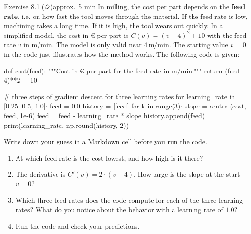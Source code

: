 \documentclass[paper=a4, fontsize=11pt, parskip=half]{scrartcl}
\begin{document}
\clearpage
\begin{aufgabe}{Exercise 8.1 (✩)}{approx.\ 5 min}
In milling, the cost per part depends on the \textbf{feed rate}, i.e. on how fast the tool moves through the material. If the feed rate is low, machining takes a long time. If it is high, the tool wears out quickly. In a simplified model, the cost in € per part is $C(v) = (v - 4)^2 + 10$ with the feed rate $v$ in m/min. The model is only valid near $4\,\text{m/min}$. The starting value $v = 0$ in the code just illustrates how the method works. The following code is given:

\begin{code}
def cost(feed):
    """Cost in € per part for the feed rate in m/min."""
    return (feed - 4)**2 + 10

# three steps of gradient descent for three learning rates
for learning_rate in [0.25, 0.5, 1.0]:
    feed = 0.0
    history = [feed]
    for k in range(3):
        slope = central(cost, feed, 1e-6)
        feed = feed - learning_rate * slope
        history.append(feed)
    print(learning_rate, np.round(history, 2))
\end{code}

Write down your guess in a Markdown cell before you run the code.

\begin{enumerate}
  \item At which feed rate is the cost lowest, and how high is it there?
  \item The derivative is $C'(v) = 2 \cdot (v - 4)$. How large is the slope at the start $v = 0$?
  \item Which three feed rates does the code compute for each of the three learning rates? What do you notice about the behavior with a learning rate of $1.0$?
  \item Run the code and check your predictions.
\end{enumerate}

\end{aufgabe}
\end{document}
